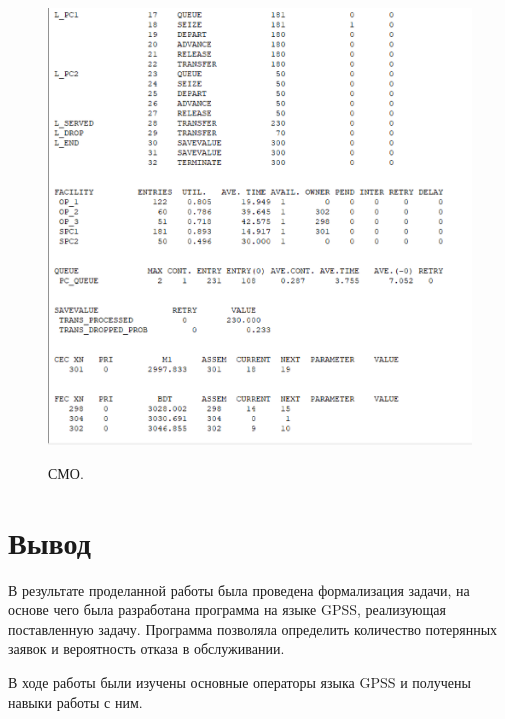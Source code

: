\documentclass[a4paper,12pt]{article}
\begin{document}
	\begin{figure}[h!]
		\begin{center}
			{\includegraphics[scale = 0.7]{2.png}}
			\label{ris:smo2}
		\end{center}
		\caption{СМО.}
	\end{figure}
	
	
	\section*{Вывод}
	
	В результате проделанной работы была проведена формализация задачи, на основе чего была разработана программа на языке GPSS, реализующая поставленную задачу.
	Программа позволяла определить количество потерянных заявок и вероятность отказа в обслуживании.
	
	В ходе работы были изучены основные операторы языка GPSS и получены
	навыки работы с ним.
	
	
\end{document}

